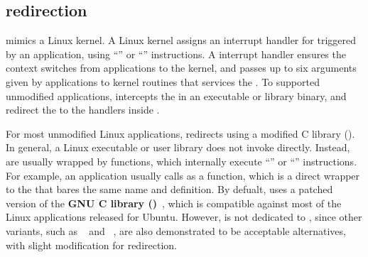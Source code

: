 \subsection{\Linuxapi{} redirection}


\thelibos{} mimics a Linux kernel. A Linux kernel assigns an interrupt handler for \linuxapis{} triggered by an application, using ``'' or ``'' instructions.
A \linuxapi{} interrupt handler
ensures the context switches from applications to the kernel,
and passes up to six \linuxapi{} arguments given by applications to kernel routines that services the \linuxapis{}.
To supported unmodified applications,
\thelibos{}
intercepts the \linuxapis{}
in an executable or library binary, and redirect the \linuxapis{}
to the \linuxapi{} handlers inside \thelibos{}.


For most unmodified Linux applications,
\thelibos{} redirects \linuxapis{} using a modified C library (\libc{}).
In general,  a Linux executable or user library does not invoke \linuxapis{} directly.
Instead, \linuxapis{}
are usually wrapped by \libc{} functions,
which internally execute ``'' or ``'' instructions.
For example, an application usually calls  as a \libc{} function, which is a direct wrapper to the \linuxapi{} that bares the same name and definition.
By defualt,
\thelibos{} uses a patched version
of the {\bf GNU C library (\glibc{})}~\cite{glibc},
which is compatible against most of the Linux applications released for Ubuntu.
However, \graphene{} is not dedicated to \glibc{}, since 
other \libc{} variants,
such as ~\cite{uclibc} and ~\cite{musl},
are also demonstrated
to be acceptable alternatives,
with slight modification for \linuxapi{} redirection.




